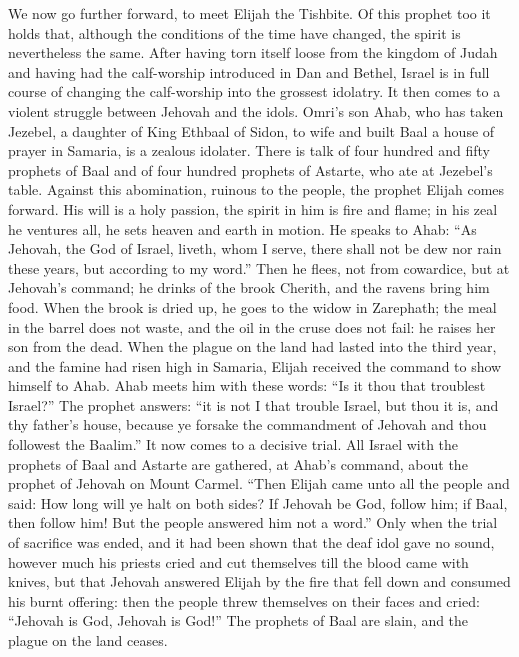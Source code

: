 \documentclass[12pt,a4paper,openany]{book}
\newcommand{\opage}[1]{\marginnote{\footnotesize\textit{[#1]}}}
\begin{document}
We now go further forward, to meet Elijah
the Tishbite. Of this prophet too it holds that, although
the conditions of the time have changed, the spirit is nevertheless
the same. After having torn itself loose from the kingdom of Judah
and having had the calf-worship introduced in Dan and Bethel,
Israel is in full course of changing the calf-worship
into the grossest idolatry. It then comes to
a violent struggle between Jehovah and the idols. Omri's
son Ahab, who has taken Jezebel, a daughter of King
Ethbaal of Sidon, to wife and built Baal a house of prayer
in Samaria, is a zealous idolater. There is talk of four
hundred and fifty prophets of Baal and of four hundred
prophets of Astarte, who ate at Jezebel's table.
Against this abomination, ruinous to the people, the prophet
Elijah comes forward. His will is a holy
\setcounter{footnote}{0}%
\opage{36}passion, the spirit in him is fire and flame; in his zeal
he ventures all, he sets heaven and earth in motion.
He speaks to Ahab: ``As Jehovah, the God of Israel,
liveth, whom I serve, there shall not be dew nor rain these years,
but according to my word.'' Then he flees,
not from cowardice, but at Jehovah's command; he drinks
of the brook Cherith, and the ravens bring him food. When
the brook is dried up, he goes to the widow in Zarephath;
the meal in the barrel does not waste, and the oil in the cruse
does not fail: he raises her son from the dead.
When the plague on the land had lasted into the third year, and the famine
had risen high in Samaria, Elijah received the command to
show himself to Ahab. Ahab meets him with these words:
``Is it thou that troublest Israel?'' The prophet answers:
``it is not I that trouble Israel, but thou it is,
and thy father's house, because ye forsake the commandment of Jehovah and thou
followest the Baalim.'' It now comes to a decisive
trial. All Israel with the prophets of Baal and Astarte
are gathered, at Ahab's command, about the prophet of Jehovah on
Mount Carmel. ``Then Elijah came unto all the people
and said: How long will ye halt on both sides?
If Jehovah be God, follow him; if Baal, then follow
him! But the people answered him not a word.'' Only
when the trial of sacrifice was ended, and it had been shown that the
deaf idol gave no sound, however much his priests
cried and cut themselves till the blood came with knives, but that
Jehovah answered Elijah by the fire that fell down and
consumed his burnt offering: then the people threw themselves on
their faces and cried: ``Jehovah is God, Jehovah is God!''
The prophets of Baal are slain, and the plague on the land ceases.
\end{document}
